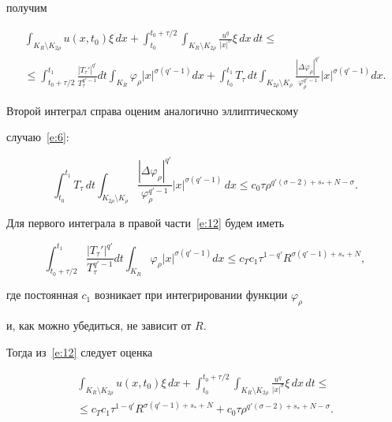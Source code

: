 получим


\begin{multline}\label{e:12}


\int_{K_R\setminus K_{2\rho}} u(x,t_0)\xi\,dx+


\int_{t_0}^{t_0+\tau/2}\int_{K_R\setminus K_{2\rho}}


\frac{u^q}{|x|^\sigma}\xi\,dx\,dt \le \\


%


\le \int_{t_0+\tau/2}^{t_1}\frac{|T_\tau'|^{q'}}


{T_\tau^{q'-1}}dt\int_{K_R}\varphi_\rho|x|^{\sigma(q'-1)}dx+


\int_{t_0}^{t_1}T_\tau\,dt\int_{K_{2\rho}\setminus K_\rho}


\frac{|\Delta\varphi_\rho|^{q'}}{\varphi_\rho^{q'-1}}|x|^{\sigma(q'-1)}dx.


\end{multline}


Второй интеграл справа оценим аналогично эллиптическому


случаю~\eqref{e:6}:


$$


\int_{t_0}^{t_1}T_\tau\,dt


\int_{K_{2\rho}\setminus K_\rho}


\frac{|\Delta\varphi_\rho|^{q'}}{\varphi_\rho^{q'-1}}


|x|^{\sigma(q'-1)}\,dx\le


c_0\tau\rho^{q'(\sigma-2)+s_*+N-\sigma}.


$$


Для первого интеграла в правой части~\eqref{e:12} будем иметь


$$


\int_{t_0+\tau/2}^{t_1}\frac{|T_\tau'|^{q'}}


{T_\tau^{q'-1}}dt\int_{K_R}\varphi_\rho|x|^{\sigma(q'-1)}dx\le


c_Tc_1\tau^{1-q'}R^{\sigma(q'-1)+s_*+N},


$$


где постоянная $c_1$ возникает при интегрировании функции $\varphi_\rho$


и, как можно убедиться, не зависит от $R$.





Тогда из~\eqref{e:12} следует оценка


\begin{multline*}\label{e:14}


\int_{K_R\setminus K_{2\rho}} u(x,t_0)\xi\,dx+


\int_{t_0}^{t_0+\tau/2}\int_{K_R\setminus K_{2\rho}}


\frac{u^q}{|x|^\sigma}\xi\,dx\,dt\le


\\


\le c_Tc_1\tau^{1-q'}R^{\sigma(q'-1)+s_*+N}+


c_0\tau\rho^{q'(\sigma-2)+s_*+N-\sigma}.


\end{multline*}


